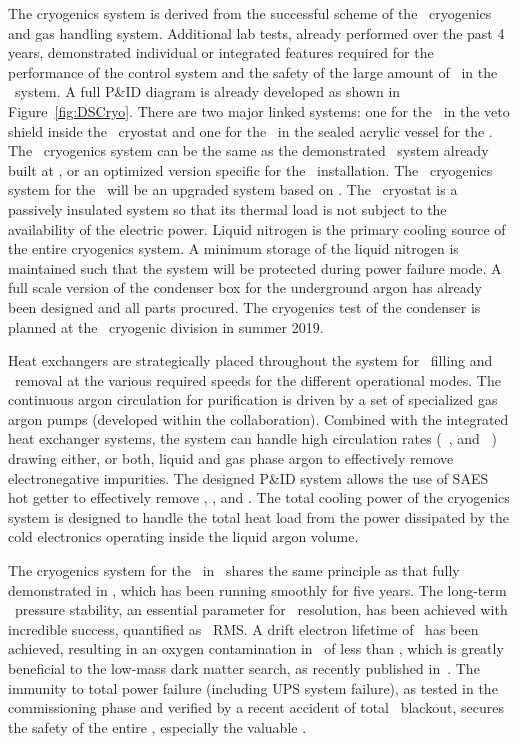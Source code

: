 The cryogenics system is derived from the successful scheme of the \DSfs\ cryogenics and gas handling system. Additional lab tests, already performed over the past 4 years, demonstrated individual or integrated features required for the performance of the control system and the safety of the large amount of \UAr\ in the \DSk\ system. A full P\&ID diagram is already developed as shown in Figure~\ref{fig:DSCryo}. There are two major linked systems: one for the \AAr\ in the veto shield inside the \pDUNE\ cryostat and one for the \UAr\ in the sealed acrylic vessel for the \LArTPC.  The \AAr\ cryogenics system can be the same as the demonstrated  \pDUNE\  system already built at \CERN, or an optimized version specific for the \LNGS\ installation. The \UAr\ cryogenics system for the \TPC\ will be an upgraded system based on \DSfs. The \pDUNE\ cryostat is a passively insulated system so that its thermal load is not subject to the availability of the electric power. Liquid nitrogen is the primary cooling source of the entire cryogenics system. A minimum storage of the liquid nitrogen is maintained such that the system will be protected during power failure mode. A full scale version of the condenser box for the underground argon has already been designed and all parts procured. The cryogenics test of the condenser is planned at the \CERN\ cryogenic division in summer 2019.

Heat exchangers are strategically placed throughout the system for \LAr\ filling and \LAr\ removal at the various required speeds for the different operational modes. The continuous argon circulation for purification is driven by a set of specialized gas argon pumps (developed within the collaboration). Combined with the integrated heat exchanger systems, the system can handle high circulation rates (\DSkCryogenicsAArFlowTotal\ \AAr, and \DSkCryogenicsGasFlowTotal\ \UAr) drawing either, or both, liquid and gas phase argon to effectively remove electronegative impurities.  The designed P\&ID system allows the use of SAES hot getter to effectively remove , , and . The total cooling power of the cryogenics system is designed to handle the total heat load from the power dissipated by the cold electronics operating inside the liquid argon volume.

The cryogenics system for the \LArTPC\ in \DSks\ shares the same principle as that fully demonstrated in \DSfs, which has been running smoothly for five years. The long-term \TPC\ pressure stability, an essential parameter for \STwo\ resolution, has been achieved with incredible success, quantified as \DSfCryogenicsPressureStability\ RMS.  A drift electron lifetime of \DSfElectronMeanLife\ has been achieved, resulting in an oxygen contamination in \LAr\ of less than \DSfUArChemicalPurity, which is greatly beneficial to the low-mass dark matter search, as recently published in~\cite{Agnes:2018fg, Agnes:2018ft}. The immunity to total power failure (including UPS system failure), as tested in the commissioning phase and verified by a recent accident of total \LNGS\ blackout, secures the safety of the entire \LArTPC, especially the valuable \UAr. 

